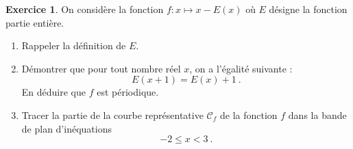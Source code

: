 \documentclass[a4paper, 11pt,openany]{article}%
\theoremstyle{plain}
\theoremstyle{definition}
\newtheorem{exo}{Exercice}
\newtheorem{sol}{Solution de l'exercice}
\theoremstyle{remark}
\begin{document}


\begin{exo}
	On considère la fonction $f\colon x \mapsto x - E(x)$ où $E$ désigne la fonction partie entière.
	\begin{enumerate}
		\item Rappeler la définition de $E$.
		\item Démontrer que pour tout nombre réel $x$, on a l'égalité suivante :
		\[
			E(x+1)	= E(x) + 1 \ .
		\]
		En déduire que $f$ est périodique. 
		\item Tracer la partie de la courbe représentative $\mathcal{C}_f$ de la fonction $f$ dans la bande de plan d'inéquations
		\[
			-2 \leqslant x < 3 \ .
		\]
	\end{enumerate}
\end{exo}
\end{document}
